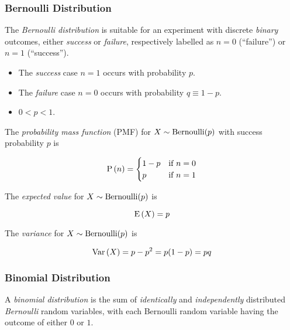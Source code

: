 \subsubsection{Bernoulli Distribution}

\begin{definition}
    The \textit{Bernoulli distribution} is suitable for an experiment with
    discrete \textit{binary} outcomes, either \textit{success} or
    \textit{failure}, respectively labelled as $n = 0$ (\enquote{failure}) or
    $n = 1$ (\enquote{success}).

    \begin{itemize}
        \item The \textit{success} case $n = 1$ occurs with probability $p$.
        \item The \textit{failure} case $n = 0$ occurs with probability $q
            \equiv 1 - p$.
        \item $0 < p < 1$.
    \end{itemize}

    The \textit{probability mass function} (PMF) for $X \sim \mathrm{Bernoulli}(p)$
    with success probability $p$ is

    \begin{equation}
        \mathrm{P} \left( n \right) =
        \begin{cases}
            1 - p & \text{if $n = 0$} \\
            p & \text{if $n = 1$} \\
        \end{cases}
    \end{equation}

    The \textit{expected value} for $X \sim \mathrm{Bernoulli}(p)$ is

    \begin{equation}
        \mathrm{E} \left( X \right) = p
    \end{equation}

    The \textit{variance} for $X \sim \mathrm{Bernoulli}(p)$ is

    \begin{equation}
        \mathrm{Var} \left( X \right) = p - p^2 = p(1 - p) = pq
    \end{equation}
\end{definition}

\subsubsection{Binomial Distribution}

\begin{remark}
    A \textit{binomial distribution} is the sum of \textit{identically}
    and \textit{independently} distributed \textit{Bernoulli} random variables,
    with each Bernoulli random variable having the outcome of either $0$ or
    $1$.
\end{remark}

